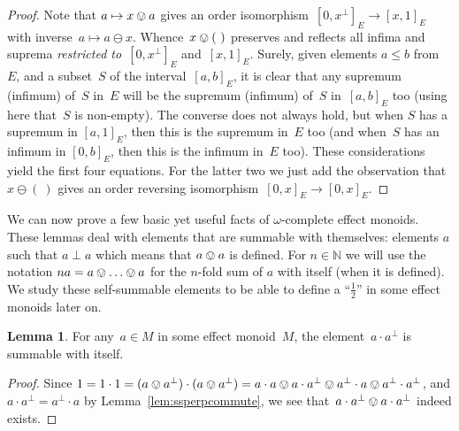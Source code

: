 \documentclass[10pt,conference]{IEEEtran}
\newcommand{\N}{\mathbb{N}}
\newcounter{counter}
\theoremstyle{definition}
\newtheorem{lemma}[counter]{Lemma}
\newcommand{\TODO}[1]{\emph{[ \textbf{TODO:} #1 ]}}
\begin{document}
\begin{proof}
    Note that $a \mapsto x\ovee a$
    gives an order isomorphism~$[0,x^\perp]_E\to [x,1]_E$
    with inverse~$a \mapsto a \ominus x$.
    Whence~$x\ovee(\ )$ preserves and reflects
    all infima and suprema \emph{restricted to}~$[0,x^\perp]_E$ and~$[x,1]_E$.
Surely,
given elements $a\leq b$ from~$E$,
and a subset~$S$ of the interval~$[a,b]_E$,
it is clear
that any supremum (infimum)
    of~$S$ in~$E$ will be the supremum (infimum) of~$S$ in~$[a,b]_E$ too
    (using here that~$S$ is non-empty).
The converse does not always hold,
    but when $S$ has a supremum in $[a,1]_E$,
    then this is the supremum in~$E$ too
    (and when~$S$ has an infimum in $[0,b]_E$,
    then this is the infimum in~$E$ too).
These considerations yield the first four equations.
For the latter two
we just add the observation
    that $x\ominus (\ )$
    gives an order reversing isomorphism~$[0,x]_E\to[0,x]_E$.
% 
\end{proof}

We can now prove a few basic yet useful facts of $\omega$-complete effect monoids. 
These lemmas deal with elements that are summable with
    themselves: elements $a$ such that $a\perp a$ which means that
    $a\ovee a$ is defined. For $n\in \N$ we will use the notation $na
    = a\ovee \ldots \ovee a$ for the $n$-fold sum of $a$ with itself
    (when it is defined).
We study these self-summable elements
    to  be able to define a ``$\frac{1}{2}$''
    in some effect monoids later on.

\begin{lemma}\label{lem:selfsummable}
    For any~$a \in M$ in some effect monoid~$M$,
    the element~$a \cdot a^\perp$ is summable with itself.
\end{lemma}
\begin{proof}
Since $1=1\cdot 1 = (a\ovee a^\perp)\cdot(a\ovee a^\perp)
    = a\cdot a\ovee a\cdot a^\perp \ovee a^\perp \cdot a \ovee 
    a^\perp\cdot a^\perp$,
    and $a\cdot a^\perp = a^\perp \cdot a$ by Lemma~\ref{lem:ssperpcommute},
    we see that~$a\cdot a^\perp\ovee a\cdot a^\perp$  indeed exists.
\end{proof}
\end{document}
